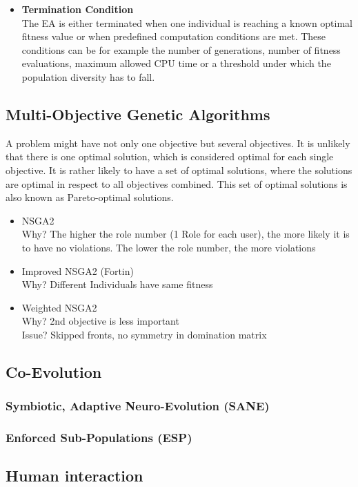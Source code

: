 \begin{itemize}
        \item \textbf{Termination Condition}\\
        The EA is either terminated when one individual is reaching a known optimal fitness value or when predefined computation conditions are met. These conditions can be for example the number of generations, number of fitness evaluations, maximum allowed CPU time or a threshold under which the population diversity has to fall.
    \end{itemize}
        
    \subsection{Multi-Objective Genetic Algorithms}
    A problem might have not only one objective but several objectives. It is unlikely that there is one optimal solution, which is considered optimal for each single objective. It is rather likely to have a set of optimal solutions, where the solutions are optimal in respect to all objectives combined. This set of optimal solutions is also known as Pareto-optimal solutions.
    
    \begin{itemize}
        \item NSGA2\\
        Why? The higher the role number (1 Role for each user), the more likely it is to have no violations. The lower the role number, the more violations
        \item Improved NSGA2 (Fortin)\\
        Why? Different Individuals have same fitness
        \item Weighted NSGA2\\
        Why? 2nd objective is less important\\
        Issue? Skipped fronts, no symmetry in domination matrix
    \end{itemize}
    
    \subsection{Co-Evolution}
    \subsubsection{Symbiotic, Adaptive Neuro-Evolution (SANE)}
    \subsubsection{Enforced Sub-Populations (ESP)}
    
    \subsection{Human interaction}